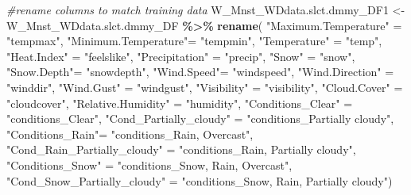 \documentclass[
]{article}
\newenvironment{Shaded}{\begin{snugshade}}{\end{snugshade}}
\newcommand{\CommentTok}[1]{\textcolor[rgb]{0.56,0.35,0.01}{\textit{#1}}}
\newcommand{\DecValTok}[1]{\textcolor[rgb]{0.00,0.00,0.81}{#1}}
\newcommand{\FunctionTok}[1]{\textcolor[rgb]{0.13,0.29,0.53}{\textbf{#1}}}
\newcommand{\NormalTok}[1]{#1}
\newcommand{\OtherTok}[1]{\textcolor[rgb]{0.56,0.35,0.01}{#1}}
\newcommand{\SpecialCharTok}[1]{\textcolor[rgb]{0.81,0.36,0.00}{\textbf{#1}}}
\newcommand{\StringTok}[1]{\textcolor[rgb]{0.31,0.60,0.02}{#1}}
\begin{document}
\begin{Shaded}
\begin{Highlighting}[]
\CommentTok{\#rename columns to match training data }
\NormalTok{W\_Mnst\_WDdata.slct.dmmy\_DF1 }\OtherTok{\textless{}{-}}\NormalTok{ W\_Mnst\_WDdata.slct.dmmy\_DF }\SpecialCharTok{\%\textgreater{}\%} 
        \FunctionTok{rename}\NormalTok{( }
          \StringTok{"Maximum.Temperature"} \OtherTok{=} \StringTok{"tempmax"}\NormalTok{,}
          \StringTok{"Minimum.Temperature"}\OtherTok{=} \StringTok{"tempmin"}\NormalTok{,}
          \StringTok{"Temperature"} \OtherTok{=} \StringTok{"temp"}\NormalTok{,}
          \StringTok{"Heat.Index"} \OtherTok{=} \StringTok{"feelslike"}\NormalTok{,}
          \StringTok{"Precipitation"} \OtherTok{=} \StringTok{"precip"}\NormalTok{,}
          \StringTok{"Snow"} \OtherTok{=} \StringTok{"snow"}\NormalTok{,}
          \StringTok{"Snow.Depth"}\OtherTok{=} \StringTok{"snowdepth"}\NormalTok{,}
          \StringTok{"Wind.Speed"}\OtherTok{=} \StringTok{"windspeed"}\NormalTok{,}
          \StringTok{"Wind.Direction"} \OtherTok{=} \StringTok{"winddir"}\NormalTok{,}
          \StringTok{"Wind.Gust"} \OtherTok{=} \StringTok{"windgust"}\NormalTok{,}
          \StringTok{"Visibility"} \OtherTok{=} \StringTok{"visibility"}\NormalTok{,}
          \StringTok{"Cloud.Cover"} \OtherTok{=} \StringTok{"cloudcover"}\NormalTok{,}
          \StringTok{"Relative.Humidity"} \OtherTok{=} \StringTok{"humidity"}\NormalTok{,}
          \StringTok{"Conditions\_Clear"} \OtherTok{=} \StringTok{"conditions\_Clear"}\NormalTok{,}
          \StringTok{"Cond\_Partially\_cloudy"} \OtherTok{=} \StringTok{"conditions\_Partially cloudy"}\NormalTok{,}
          \StringTok{"Conditions\_Rain"}\OtherTok{=} \StringTok{"conditions\_Rain, Overcast"}\NormalTok{,}
          \StringTok{"Cond\_Rain\_Partially\_cloudy"} \OtherTok{=} \StringTok{"conditions\_Rain, Partially cloudy"}\NormalTok{,}
          \StringTok{"Conditions\_Snow"} \OtherTok{=} \StringTok{"conditions\_Snow, Rain, Overcast"}\NormalTok{,}
          \StringTok{"Cond\_Snow\_Partially\_cloudy"} \OtherTok{=} \StringTok{"conditions\_Snow, Rain, Partially cloudy"}\NormalTok{)}
\end{Highlighting}
\end{Shaded}

\begin{Shaded}
\end{Shaded}
\end{document}

